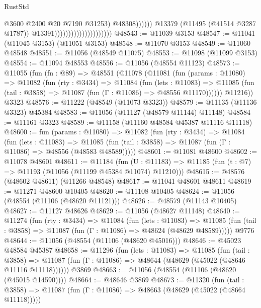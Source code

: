 \begin{lexlean}{RustStd}
\begin{coremodule}
                                                            @3600
                                                            @2400
                                                            @20
                                                            @7190
                                                            @31253)
                                                          @48308))))))
                                              @13379
                                              (@11495 (@41514 @3287 @1787))
                                              @13391)))))))))))))))))))))
@48543 := @11039 @3153
@48547 := @11041 (@11045 @3153) (@11051 @3153)
@48548 := @11070 @3153
@48549 := @11060 @48548
@48551 := @11056 (@48549 @11075)
@48553 := @11098 (@11099 @3153)
@48554 := @11094 @48553
@48556 := @11056 (@48554 @11123)
@48573 := @11055
    (fun (fn : @89) =>
    @48551
      (@11078
        (@11081
          (fun (params : @11080) =>
          @11082
            (fun (rty : @3434) =>
            @11084
              (fun (lets : @11083) =>
              @11085 (fun (tail : @3858) => @11087 (fun (Γ : @11086) => @48556 @11170))))))
        @11216))
    @3323
@48576 := @11222 (@48549 (@11073 @3323))
@48579 := @11135 (@11136 @3323) @45384
@48583 := @11056 (@11127 (@48579 @11144) @11148)
@48584 := @11161 @3323
@48589 := @11158 (@11160 @48584 @45387 @11116 @11118)
@48600 := fun (params : @11080) =>
  @11082
    (fun (rty : @3434) =>
    @11084
      (fun (lets : @11083) =>
      @11085 (fun (tail : @3858) => @11087 (fun (Γ : @11086) => @48556 (@48583 @48589)))))
@48601 := @11081 @48600
@48602 := @11078 @48601
@48611 := @11184
    (fun (U : @11183) => @11185 (fun (t : @7) => @11193 (@11056 (@11199 @45384 @11074) @11210)))
@48615 := @48576 (@48602 @48611) (@11266 @48548)
@48617 := @11041 @48601 @48611
@48619 := @11271 @48600 @10405
@48620 := @11108 @10405
@48624 := @11056 (@48554 (@11106 (@48620 @11121)))
@48626 := @48579 (@11143 @10405)
@48627 := @11127 @48626
@48629 := @11056 (@48627 @11148)
@48640 := @11274
    (fun (rty : @3434) =>
    @11084
      (fun (lets : @11083) =>
      @11085 (fun (tail : @3858) => @11087 (fun (Γ : @11086) => @48624 (@48629 @48589)))))
    @9776
@48644 := @11056 (@48554 (@11106 (@48620 @45016)))
@48646 := @45023 @48584 @45387
@48658 := @11296
    (fun (lets : @11083) =>
    @11085
      (fun (tail : @3858) =>
      @11087 (fun (Γ : @11086) => @48644 (@48629 (@45022 (@48646 @11116 @11118))))))
    @3869
@48663 := @11056 (@48554 (@11106 (@48620 (@45015 @14590))))
@48664 := @48646 @3869
@48673 := @11320
    (fun (tail : @3858) => @11087 (fun (Γ : @11086) => @48663 (@48629 (@45022 (@48664 @11118)))))

\end{coremodule}
\end{lexlean}
